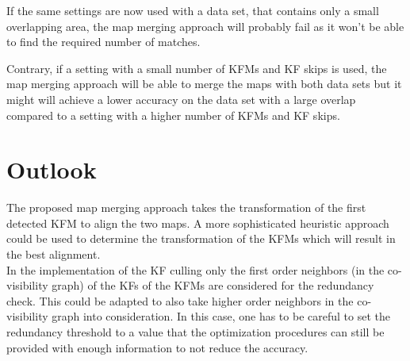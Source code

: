 If the same settings are now used with a data set, that contains only a small overlapping area, the map merging approach will probably fail as it won't be able to find the required number of matches.

Contrary, if a setting with a small number of \acp{KFM} and \ac{KF} skips is used, the map merging approach will be able to merge the maps with both data sets but it might will achieve a lower accuracy on the data set with a large overlap compared to a setting with a higher number of \acp{KFM} and \ac{KF} skips.

\section{Outlook}

The proposed map merging approach takes the transformation of the first detected \ac{KFM} to align the two maps. A more sophisticated heuristic approach could be used to determine the transformation of the \acp{KFM} which will result in the best alignment.\\

In the implementation of the \ac{KF} culling only the first order neighbors (in the co-visibility graph) of the \acp{KF} of the \acp{KFM} are considered for the redundancy check. This could be adapted to also take higher order neighbors in the co-visibility graph into consideration. In this case, one has to be careful to set the redundancy threshold to a value that the optimization procedures can still be provided with enough information to not reduce the accuracy.
